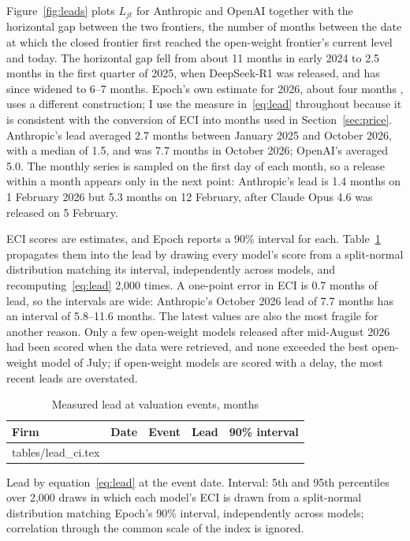 \documentclass[12pt]{article}
\makeatletter
\newcommand{\tabinput}[1]{\@@input #1 }
\makeatother
\begin{document}
Figure~\ref{fig:leads} plots $L_{jt}$ for Anthropic and OpenAI together with the horizontal gap between the two frontiers, the number of months between the date at which the closed frontier first reached the open-weight frontier's current level and today. The horizontal gap fell from about 11 months in early 2024 to 2.5 months in the first quarter of 2025, when DeepSeek-R1 was released, and has since widened to 6--7 months. Epoch's own estimate for 2026, about four months \citep{epoch2026gap}, uses a different construction; I use the measure in~\eqref{eq:lead} throughout because it is consistent with the conversion of ECI into months used in Section~\ref{sec:price}. Anthropic's lead averaged 2.7 months between January 2025 and October 2026, with a median of 1.5, and was 7.7 months in October 2026; OpenAI's averaged 5.0. The monthly series is sampled on the first day of each month, so a release within a month appears only in the next point: Anthropic's lead is 1.4 months on 1 February 2026 but 5.3 months on 12 February, after Claude Opus 4.6 was released on 5 February.

ECI scores are estimates, and Epoch reports a 90\% interval for each. Table~\ref{tab:leadci} propagates them into the lead by drawing every model's score from a split-normal distribution matching its interval, independently across models, and recomputing~\eqref{eq:lead} 2,000 times. A one-point error in ECI is 0.7 months of lead, so the intervals are wide: Anthropic's October 2026 lead of 7.7 months has an interval of 5.8--11.6 months. The latest values are also the most fragile for another reason. Only a few open-weight models released after mid-August 2026 had been scored when the data were retrieved, and none exceeded the best open-weight model of July; if open-weight models are scored with a delay, the most recent leads are overstated.

\begin{table}[t]
\centering
\begin{threeparttable}
\caption{Measured lead at valuation events, months}
\label{tab:leadci}
\small
\begin{tabular}{lllcc}
\toprule
Firm & Date & Event & Lead & 90\% interval \\
\midrule
\tabinput{tables/lead_ci.tex}
\bottomrule
\end{tabular}
\begin{tablenotes}\footnotesize
\item Lead by equation~\eqref{eq:lead} at the event date. Interval: 5th and 95th percentiles over 2,000 draws in which each model's ECI is drawn from a split-normal distribution matching Epoch's 90\% interval, independently across models; correlation through the common scale of the index is ignored.
\end{tablenotes}
\end{threeparttable}
\end{table}
\end{document}
